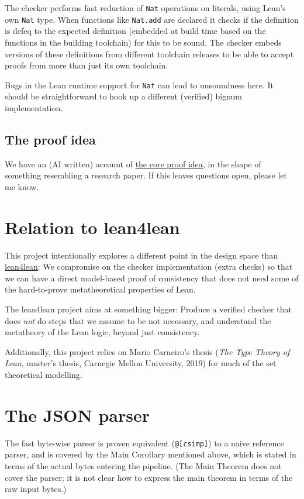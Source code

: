 \documentclass{article}
\newcommand\code[1]{\texttt{#1}}
\begin{document}
The checker performs fast reduction of \code{Nat} operations on literals, using Lean's own \code{Nat} type. When functions like \code{Nat.add} are declared it checks if the definition is defeq to the expected definition (embedded at build time based on the functions in the building toolchain) for this to be sound. The checker embeds versions of these definitions from different toolchain releases to be able to accept proofs from more than just its own toolchain.

Bugs in the Lean runtime support for \code{Nat} can lead to unsoundness here. It should be straightforward to hook up a different (verified) bignum implementation.

\subsection*{The proof idea}

We have an (AI written) account of \href{https://leanprover.github.io/con-leche/con-leche-proof-idea.html}{the core proof idea}, in the shape of something resembling a research paper. If this leaves questions open, please let me know.

\section*{Relation to lean4lean}

This project intentionally explores a different point in the design space than \href{https://github.com/digama0/lean4lean/}{lean4lean}: We compromise on the checker implementation (extra checks) so that we can have a direct model-based proof of consistency that does not need some of the hard-to-prove metatheoretical properties of Lean.

The lean4lean project aims at something bigger: Produce a verified checker that does \emph{not} do steps that we assume to be not necessary, and understand the metatheory of the Lean logic, beyond just consistency.

Additionally, this project relies on Mario Carneiro's thesis (\emph{The Type Theory of Lean}, master's thesis, Carnegie Mellon University, 2019) for much of the set theoretical modelling.

\section*{The JSON parser}

The fast byte-wise parser is proven equivalent (\code{@[csimp]}) to a naive reference parser, and is covered by the Main Corollary mentioned above, which is stated in terms of the actual bytes entering the pipeline. (The Main Theorem does not cover the parser; it is not clear how to express the main theorem in terms of the raw input bytes.)
\end{document}
